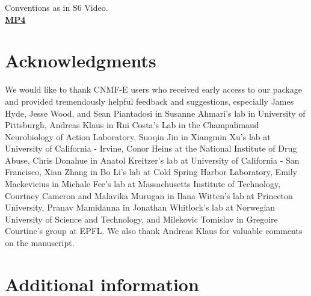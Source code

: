 \documentclass[9pt,lineno]{elife}
\begin{document}
 Conventions as in S6 Video. \\
\href{http://www.columbia.edu/~pz2230/videos/footshock_demixing.mp4}{\bf MP4}

\section{Acknowledgments}
We would like to thank CNMF-E users who received early access to our package and provided tremendously helpful feedback and suggestions, especially James Hyde, Jesse Wood, and Sean Piantadosi in Susanne Ahmari's lab in University of Pittsburgh, Andreas Klaus in Rui Costa's Lab in the Champalimaud Neurobiology of Action Laboratory, Suoqin Jin in Xiangmin Xu's lab at University of California - Irvine, Conor Heins at the National Institute of Drug Abuse, Chris Donahue in Anatol Kreitzer's lab at University of California - San Francisco, Xian Zhang in Bo Li's lab at Cold Spring Harbor Laboratory, Emily Mackevicius in Michale Fee's lab at Massachusetts Institute of Technology, Courtney Cameron and Malavika Murugan in Ilana Witten's lab at Princeton University, Pranav Mamidanna in Jonathan Whitlock's lab at Norwegian University of Science and Technology, and Milekovic Tomislav in Gregoire Courtine's group at EPFL. We also thank Andreas Klaus for valuable comments on the manuscript. 

\section{Additional information}
\clearpage
\end{document}
